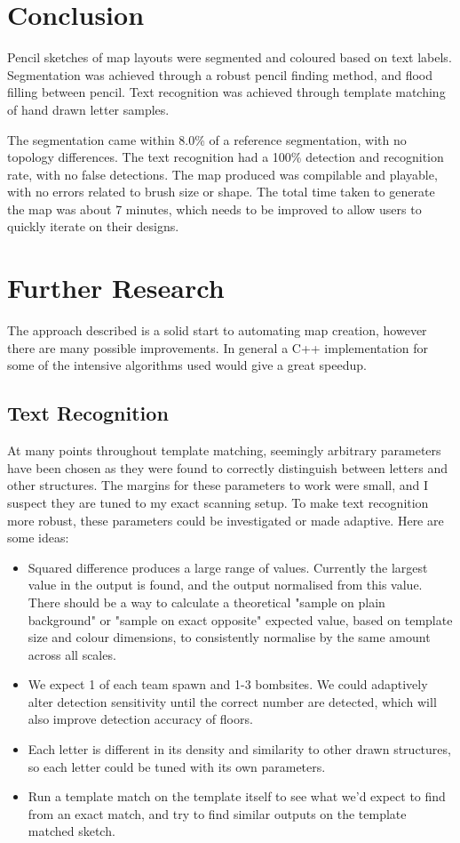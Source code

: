 \documentclass[conference]{IEEEtran}
\begin{document}
\section{Conclusion}

Pencil sketches of map layouts were segmented and coloured based on text labels. Segmentation was achieved through a robust pencil finding method, and flood filling between pencil. Text recognition was achieved through template matching of hand drawn letter samples. 

The segmentation came within 8.0\% of a reference segmentation, with no topology differences. The text recognition had a 100\% detection and recognition rate, with no false detections. The map produced was compilable and playable, with no errors related to brush size or shape. The total time taken to generate the map was about 7 minutes, which needs to be improved to allow users to quickly iterate on their designs.

\section{Further Research}

The approach described is a solid start to automating map creation, however there are many possible improvements. In general a C++ implementation for some of the intensive algorithms used would give a great speedup.

\subsection{Text Recognition}

At many points throughout template matching, seemingly arbitrary parameters have been chosen as they were found to correctly distinguish between letters and other structures. The margins for these parameters to work were small, and I suspect they are tuned to my exact scanning setup. To make text recognition more robust, these parameters could be investigated or made adaptive. Here are some ideas:

\begin{itemize}
\item Squared difference produces a large range of values. Currently the largest value in the output is found, and the output normalised from this value. There should be a way to calculate a theoretical "sample on plain background" or "sample on exact opposite" expected value, based on template size and colour dimensions, to consistently normalise by the same amount across all scales. 
\item We expect 1 of each team spawn and 1-3 bombsites. We could adaptively alter detection sensitivity until the correct number are detected, which will also improve detection accuracy of floors. 
\item Each letter is different in its density and similarity to other drawn structures, so each letter could be tuned with its own parameters.
\item Run a template match on the template itself to see what we'd expect to find from an exact match, and try to find similar outputs on the template matched sketch.
\end{itemize}
\end{document}
